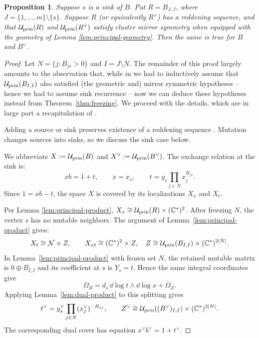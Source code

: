 \documentclass[12pt, letter]{amsart}
\newtheorem{proposition}[theorem]{Proposition}
\theoremstyle{definition}
\newcommand{\Nn}{\mathcal N}
\newcommand{\pr}{\mathrm{prin}}
\numberwithin{equation}{section}
\begin{document}
\begin{proposition}\label{prop:sink-step}
Suppose $s$ is a sink of $B$. Put $R=B_{J,J}$, where
$J=\{1,\ldots,m\}\setminus\{s\}$. 
Suppose $R$ (or equivalently $R^\vee$) has a reddening sequence, and that  $\cU_{\pr}(R)$ and $\cU_{\pr}(R^\vee)$ satisfy cluster mirror symmetry when equipped with the geometry of Lemma \ref{lem:principal-geometry}.
Then the same is true for 
$B$ and $B^\vee$. 
\end{proposition}
\begin{proof}
Let
$N=\{j:B_{js}>0\}$ and $I=J\setminus N$.
The remainder of this proof largely amounts to the observation that, while in \cite{HS} we had to inductively assume that $\cU_{\pr}(B_{I, I})$ also satisfied (the geometric and) mirror symmetric hypotheses -- hence we had to assume sink recurrence -- now we can deduce these hypotheses instead from 
Theorem~\ref{thm:freezing}.  We proceed with the details, which are in large part a recapitulation of  \cite{HS}.

Adding a source or sink preserves existence of a reddening
sequence \cite[Theorem~4.5 and Remark~4.6]{CL}.
  Mutation changes sources into sinks, so we discuss the sink case below.

We abbreviate $X:=\cU_{\pr}(B)$ and $X^\vee:=\cU_{\pr}(B^\vee)$. 
The exchange relation at the sink is: 
\begin{equation}\label{eq:sink-relation}
 xb=1+t,\qquad x=x_s,\qquad
 t=y_s\prod_{j\in N}x_j^{B_{js}}.
\end{equation}
Since $1=xb-t$, the space $X$ is covered by its localizations $X_x$ and $X_t$. 

Per Lemma \ref{lem:principal-product},
 $X_x\cong \cU_{\pr}(R)\times(\C^*)^2$.
After freezing $N$, the vertex $s$ has no mutable neighbors. 
The argument of Lemma~\ref{lem:principal-product} gives:
\begin{equation}\label{eq:sink-product}
 X_t\cong\Nn\times Z,\qquad
 X_{xt}\cong(\C^*)^2\times Z,
 \quad Z\cong \cU_{\pr}(B_{I,I})\times(\C^*)^{2|N|}.
\end{equation}
In Lemma~\ref{lem:principal-product} with frozen set $N$, the
retained mutable matrix is $0\oplus B_{I,I}$ and its coefficient
at $s$ is $Y_s=t$. Hence the same integral coordinates give
\[
 \Omega_B=d_s\,\dd\log t\wedge\dd\log x+\Omega_Z.
\]
Applying Lemma~\ref{lem:dual-product} to this splitting gives
\[
 t^\vee=y_s^\vee\prod_{j\in N}(x_j^\vee)^{-B_{sj}},\qquad
 Z^\vee\cong \cU_{\pr}((B^\vee)_{I,I})\times(\C^*)^{2|N|}.
\]
The corresponding dual cover has equation $x^\vee b^\vee=1+t^\vee$.


\end{proof}
\end{document}
